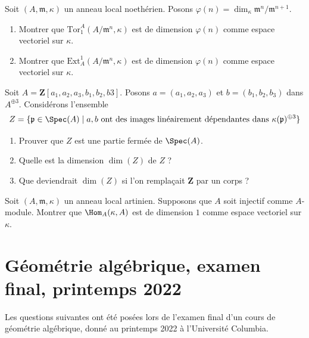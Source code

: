 \begin{exercise}
\label{exercise-compute-tor-ext}
Soit $(A, \mathfrak m, \kappa)$ un anneau local noethérien.
Posons $\varphi(n) = \dim_\kappa \mathfrak m^n/\mathfrak m^{n + 1}$.
\begin{enumerate}
\item Montrer que $\text{Tor}_1^A(A/\mathfrak m^n, \kappa)$
est de dimension $\varphi(n)$ comme espace vectoriel sur $\kappa$.
\item Montrer que $\text{Ext}^1_A(A/\mathfrak m^n, \kappa)$
est de dimension $\varphi(n)$ comme espace vectoriel sur $\kappa$.
\end{enumerate}
\end{exercise}

\begin{exercise}
\label{exercise-two-vectors}
Soit $A = \mathbf{Z}[a_1, a_2, a_3, b_1, b_2, b3]$. Posons
$a = (a_1, a_2, a_3)$ et $b = (b_1, b_2, b_3)$ dans $A^{\oplus 3}$.
Considérons l'ensemble
$$
Z = \{\mathfrak p \in \Spec(A) \mid a, b
\text{ ont des images linéairement dépendantes dans }
\kappa(\mathfrak p)^{\oplus 3}\}
$$
\begin{enumerate}
\item Prouver que $Z$ est une partie fermée de $\Spec(A)$.
\item Quelle est la dimension $\dim(Z)$ de $Z$ ?
\item Que deviendrait $\dim(Z)$ si l'on remplaçait $\mathbf{Z}$ par un corps ?
\end{enumerate}
\end{exercise}

\begin{exercise}[Injectifs]
\label{exercise-injective-artinian-local}
Soit $(A, \mathfrak m, \kappa)$ un anneau local artinien.
Supposons que $A$ soit injectif comme $A$-module. Montrer que
$\Hom_A(\kappa, A)$ est de dimension $1$ comme
espace vectoriel sur $\kappa$.
\end{exercise}



\section{Géométrie algébrique, examen final, printemps 2022}
\label{section-final-exam-spring-2022}

\noindent
Les questions suivantes ont été posées lors de l'examen final d'un cours de géométrie algébrique,
donné au printemps 2022 à l'Université Columbia.

